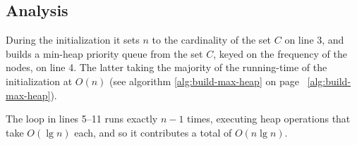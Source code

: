 \subsection{Analysis}
During the initialization it sets $n$ to the cardinality of the set $C$ on
line 3, and builds a min-heap priority queue from the set $C$, keyed on the
frequency of the nodes, on line 4. The latter taking the majority of the
running-time of the initialization at $O(n)$ (see algorithm
\ref{alg:build-max-heap} on page ~\ref{alg:build-max-heap}).

The loop in lines 5--11 runs exactly $n-1$ times, executing heap operations
that take $O(\lg n)$ each, and so it contributes a total of $O(n \lg n)$.


	

